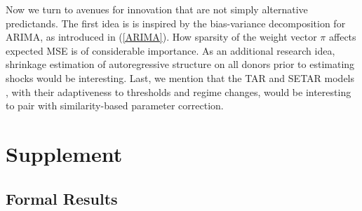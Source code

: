 \documentclass{uiucthesis2021}
\theoremstyle{definition}
\begin{document}
Now we turn to avenues for innovation that are not simply alternative predictands.  The first idea is is inspired by the bias-variance decomposition for ARIMA, as introduced in (\ref{ARIMA}).  How sparsity of the weight vector $\pi$ affects expected MSE is of considerable importance.  As an additional research idea, shrinkage estimation of autoregressive structure on all donors prior to estimating shocks would be interesting.  Last, we mention that the TAR and SETAR models \cite[][]{tsay2005analysis}, with their adaptiveness to thresholds and regime changes, would be interesting to pair with similarity-based parameter correction.

  
  
  
    
  
  \section{Supplement}
  
  \subsection{Formal Results}
  
\end{document}
